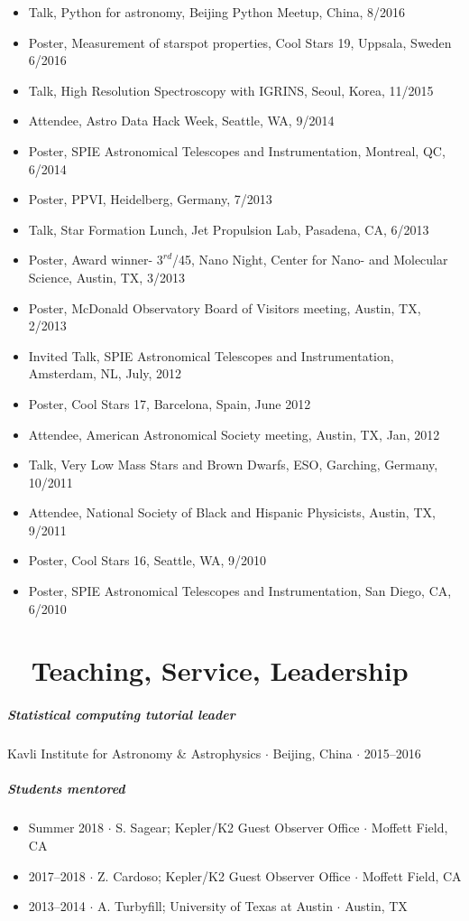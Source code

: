\documentclass[10pt,letterpaper]{article}
\begin{document}
\begin{itemize}
    \item Talk, Python for astronomy, Beijing Python Meetup, China, 8/2016
    \item Poster, Measurement of starspot properties, Cool Stars 19, Uppsala, Sweden 6/2016
    \item Talk, High Resolution Spectroscopy with IGRINS, Seoul, Korea, 11/2015
    \item Attendee, Astro Data Hack Week, Seattle, WA, 9/2014
    \item Poster, SPIE Astronomical Telescopes and Instrumentation, Montreal, QC, 6/2014
    \item Poster, PPVI, Heidelberg, Germany, 7/2013
    \item Talk, Star Formation Lunch, Jet Propulsion Lab, Pasadena, CA, 6/2013
    \item Poster, Award winner- $3^{rd}$/45, Nano Night, Center for Nano- and Molecular Science, Austin, TX, 3/2013
    \item Poster, McDonald Observatory Board of Visitors meeting, Austin, TX, 2/2013
    \item Invited Talk, SPIE Astronomical Telescopes and Instrumentation, Amsterdam, NL, July, 2012
    \item Poster, Cool Stars 17, Barcelona, Spain, June 2012
    \item Attendee, American Astronomical Society meeting, Austin, TX, Jan, 2012
    \item Talk, Very Low Mass Stars and Brown Dwarfs, ESO, Garching, Germany, 10/2011
    \item Attendee, National Society of Black and Hispanic Physicists, Austin, TX, 9/2011
    \item Poster, Cool Stars 16, Seattle, WA, 9/2010
    \item Poster, SPIE Astronomical Telescopes and Instrumentation, San Diego, CA, 6/2010
\end{itemize}


\section*{\faPlus ~ Teaching, Service, Leadership}

\subparagraph{Statistical computing tutorial leader}
Kavli Institute for Astronomy \& Astrophysics $\cdot$ Beijing, China $\cdot$ 2015--2016

\subparagraph{Students mentored}
\begin{itemize}
  \item Summer 2018 $\cdot$ S. Sagear; Kepler/K2 Guest Observer Office $\cdot$ Moffett Field, CA
  \item 2017--2018 $\cdot$ Z. Cardoso; Kepler/K2 Guest Observer Office $\cdot$ Moffett Field, CA
  \item 2013--2014 $\cdot$ A. Turbyfill; University of Texas at Austin $\cdot$ Austin, TX
\end{itemize}
\end{document}
